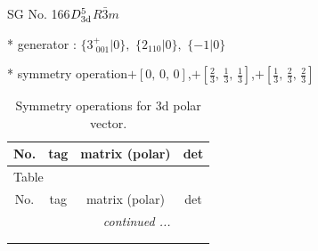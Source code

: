 \documentclass[fleqn,8pt]{jsarticle}
\begin{document}
\setcounter{MaxMatrixCols}{32}

\renewcommand{\tablename}{Table~}
\renewcommand{\figurename}{Figure~}
\begin{center}
\LARGE
SG No. 166\quad$D_{\rm 3d}^{5}$\quad$R\bar{3}m$\quad[ trigonal ]
\end{center}

* generator : $\{3^{+}_{\,\,001}|0\},\,\,\{2{}_{110}|0\},\,\,\{-1|0\}$

* symmetry operation\quad$+\left[ 0,\, 0,\, 0 \right]$,\quad $+\left[ \frac{2}{3},\, \frac{1}{3},\, \frac{1}{3} \right]$,\quad $+\left[ \frac{1}{3},\, \frac{2}{3},\, \frac{2}{3} \right]$
\renewcommand{\arraystretch}{1.3}
\begin{longtable}{cccc}
\caption{Symmetry operations for 3d polar vector.}
 \\
 \hline \hline
No. & tag & matrix (polar) & det \\ \hline \endfirsthead

\multicolumn{3}{l}{\tablename\ \thetable{}} \\
 \hline \hline
No. & tag & matrix (polar) & det \\ \hline \endhead

 \hline \hline
\multicolumn{3}{r}{\footnotesize\it continued ...} \\ \endfoot

 \hline \hline
\multicolumn{3}{r}{} \\ \endlastfoot


\end{longtable}
\end{document}
